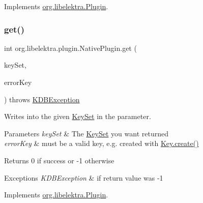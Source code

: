 Implements \hyperlink{interfaceorg_1_1libelektra_1_1Plugin_aa91370570c862ebe9eb83094a4731b9a}{org.\+libelektra.\+Plugin}.

\mbox{\label{classorg_1_1libelektra_1_1plugin_1_1NativePlugin_a766870e5f26cab4d497ed7c2fbc4abd9}} 
\subsubsection{\texorpdfstring{get()}{get()}}
{\footnotesize\ttfamily int org.\+libelektra.\+plugin.\+Native\+Plugin.\+get (\begin{DoxyParamCaption}\item[{\hyperlink{classorg_1_1libelektra_1_1KeySet}{Key\+Set}}]{key\+Set,  }\item[{\hyperlink{classorg_1_1libelektra_1_1Key}{Key}}]{error\+Key }\end{DoxyParamCaption}) throws \hyperlink{classorg_1_1libelektra_1_1exception_1_1KDBException}{K\+D\+B\+Exception}\hspace{0.3cm}{\ttfamily [inline]}}



Writes into the given \hyperlink{classorg_1_1libelektra_1_1KeySet}{Key\+Set} in the parameter. 


\begin{DoxyParams}{Parameters}
{\em key\+Set} & The \hyperlink{classorg_1_1libelektra_1_1KeySet}{Key\+Set} you want returned \\
\hline
{\em error\+Key} & must be a valid key, e.\+g. created with \hyperlink{classorg_1_1libelektra_1_1Key_af407cf43625618af4e7fb2576037fcfc}{Key.\+create()} \\
\hline
\end{DoxyParams}
\begin{DoxyReturn}{Returns}
0 if success or -\/1 otherwise 
\end{DoxyReturn}

\begin{DoxyExceptions}{Exceptions}
{\em K\+D\+B\+Exception} & if return value was -\/1 \\
\hline
\end{DoxyExceptions}


Implements \hyperlink{interfaceorg_1_1libelektra_1_1Plugin_a9b8362549b7ab8ca5eff39cf6b7c8046}{org.\+libelektra.\+Plugin}.

